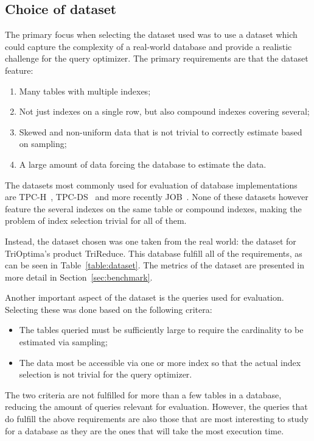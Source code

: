 \subsection{Choice of dataset}\label{sec:dataset}
The primary focus when selecting the dataset used was to use a dataset which
could capture the complexity of a real-world database and provide a realistic
challenge for the query optimizer. The primary requirements are that the dataset
feature:
\begin{enumerate}
\item Many tables with multiple indexes;
\item Not just indexes on a single row, but also compound indexes covering
  several;
\item Skewed and non-uniform data that is not trivial to correctly estimate
  based on sampling;
\item A large amount of data forcing the database to estimate the data.
\end{enumerate}

The datasets most commonly used for evaluation of database implementations are
TPC-H~\cite{tpc_th}, TPC-DS~\cite{tpc_tha} and more recently
JOB~\cite{leis_2015_how_hgaqor}. None of these datasets however feature the
several indexes on the same table or compound indexes, making the problem of
index selection trivial for all of them.

Instead, the dataset chosen was one taken from the real world: the dataset for
TriOptima's product TriReduce. This database fulfill all of the requirements, as
can be seen in Table~\ref{table:dataset}. The metrics of the dataset are
presented in more detail in Section~\ref{sec:benchmark}.

Another important aspect of the dataset is the queries used for evaluation.
Selecting these was done based on the following critera:
\begin{itemize}
\item The tables queried must be sufficiently large to require the cardinality to be
  estimated via sampling;
\item The data most be accessible via one or more index so that the actual index
  selection is not trivial for the query optimizer.
\end{itemize}

The two criteria are not fulfilled for more than a few tables in a database,
reducing the amount of queries relevant for evaluation. However, the queries
that do fulfill the above requirements are also those that are most interesting
to study for a database as they are the ones that will take the most execution time.

